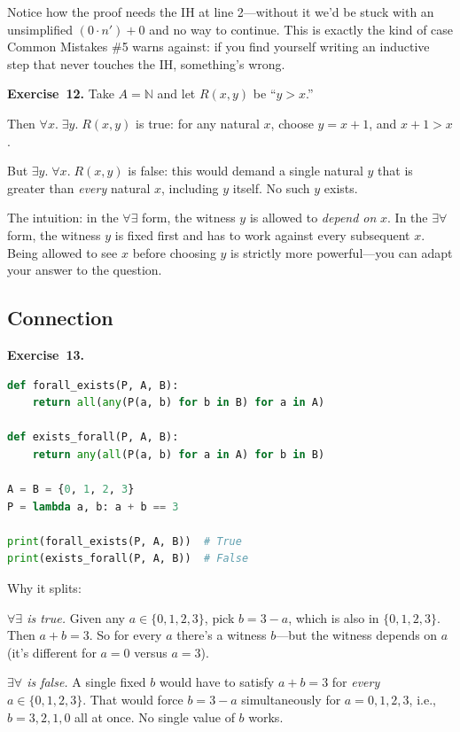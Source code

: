 \documentclass[11pt]{article}
\begin{document}
Notice how the proof needs the IH at line 2---without it we'd be stuck with an unsimplified $(0 \cdot n') + 0$ and no way to continue. This is exactly the kind of case Common Mistakes \#5 warns against: if you find yourself writing an inductive step that never touches the IH, something's wrong.

\medskip
\textbf{Exercise~12.}
Take $A = \mathbb{N}$ and let $R(x, y)$ be ``$y > x$.''

Then $\forall x.\; \exists y.\; R(x, y)$ is true: for any natural $x$, choose $y = x + 1$, and $x + 1 > x$.

But $\exists y.\; \forall x.\; R(x, y)$ is false: this would demand a single natural $y$ that is greater than \emph{every} natural $x$, including $y$ itself. No such $y$ exists.

The intuition: in the $\forall\exists$ form, the witness $y$ is allowed to \emph{depend on} $x$. In the $\exists\forall$ form, the witness $y$ is fixed first and has to work against every subsequent $x$. Being allowed to see $x$ before choosing $y$ is strictly more powerful---you can adapt your answer to the question.

\subsection*{Connection}

\textbf{Exercise~13.}
\begin{lstlisting}[language=Python]
def forall_exists(P, A, B):
    return all(any(P(a, b) for b in B) for a in A)

def exists_forall(P, A, B):
    return any(all(P(a, b) for a in A) for b in B)

A = B = {0, 1, 2, 3}
P = lambda a, b: a + b == 3

print(forall_exists(P, A, B))  # True
print(exists_forall(P, A, B))  # False
\end{lstlisting}
Why it splits:

\emph{$\forall\exists$ is true.} Given any $a \in \{0, 1, 2, 3\}$, pick $b = 3 - a$, which is also in $\{0, 1, 2, 3\}$. Then $a + b = 3$. \checkmark So for every $a$ there's a witness $b$---but the witness depends on $a$ (it's different for $a = 0$ versus $a = 3$).

\emph{$\exists\forall$ is false.} A single fixed $b$ would have to satisfy $a + b = 3$ for \emph{every} $a \in \{0, 1, 2, 3\}$. That would force $b = 3 - a$ simultaneously for $a = 0, 1, 2, 3$, i.e., $b = 3, 2, 1, 0$ all at once. No single value of $b$ works. \checkmark
\end{document}
